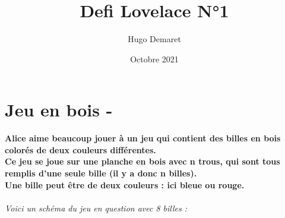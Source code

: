 \documentclass{article}
\title{Defi Lovelace N°1}
\author{Hugo Demaret}
\date{Octobre 2021}
\begin{document}
\maketitle
    \section*{Jeu en bois -}
        \textbf{Alice aime beaucoup jouer à un jeu qui contient des billes en bois colorés de deux couleurs différentes.}\\
        \textbf{Ce jeu se joue sur une planche en bois avec n trous, qui sont tous remplis d'une seule bille (il y a donc n billes). \\Une bille peut être de deux couleurs : ici bleue ou rouge.}\\\\
        \textit{Voici un schéma du jeu en question avec 8 billes :}
\end{document}
